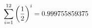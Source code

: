 \documentclass[preview]{standalone}
\begin{document}
\begin{align*}
\sum_{i=1}^{ 12 } \left({ 1 } \over {2} \right)^i = { 0.999755859375 }
\end{align*}
\end{document}
